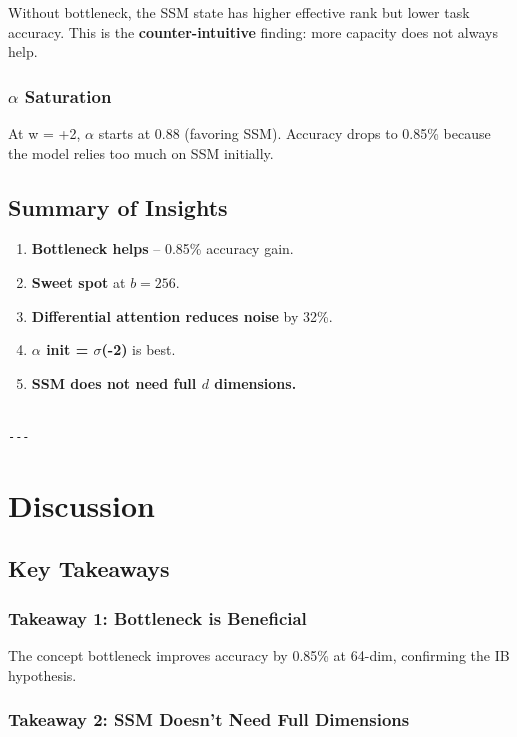 Without bottleneck, the SSM state has higher effective rank but lower 
task accuracy. This is the \textbf{counter-intuitive} finding: more capacity 
does not always help.

\subsubsection{$\alpha$ Saturation}

At w  = +2, $\alpha$ starts at 0.88 (favoring SSM). Accuracy drops to 0.85\% 
because the model relies too much on SSM initially.

\subsection{Summary of Insights}

\begin{enumerate}
\item \textbf{Bottleneck helps} -- 0.85\% accuracy gain.
\item \textbf{Sweet spot} at $b = 256$.
\item \textbf{Differential attention reduces noise} by 32\%.
\item \textbf{$\alpha$ init = $\sigma$(-2)} is best.
\item \textbf{SSM does not need full $d$ dimensions.}
\end{enumerate}
\begin{lstlisting}

---
\end{lstlisting}

\section{Discussion}

\subsection{Key Takeaways}

\subsubsection{Takeaway 1: Bottleneck is Beneficial}

The concept bottleneck improves accuracy by 0.85\% at 
64-dim, confirming the IB hypothesis.

\subsubsection{Takeaway 2: SSM Doesn't Need Full Dimensions}

